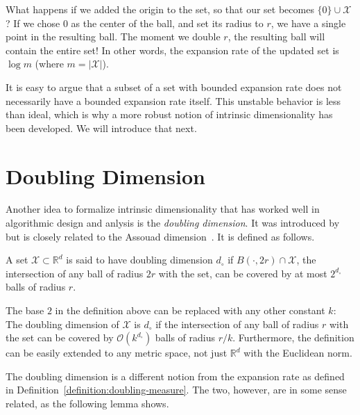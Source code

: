 What happens if we added the origin to the set, so that our set becomes $\{ 0 \} \cup \mathcal{X}$?
If we chose $0$ as the center of the ball, and set its radius to $r$,
we have a single point in the resulting ball. The moment we double $r$,
the resulting ball will contain the entire set! In other words, the expansion rate
of the updated set is $\log m$ (where $m = \lvert \mathcal{X} \rvert$).

It is easy to argue that a subset of a set with bounded expansion rate
does not necessarily have a bounded expansion rate itself.
This unstable behavior is less than ideal, which is why a more robust notion
of intrinsic dimensionality has been developed.
We will introduce that next.

\section{Doubling Dimension}
\label{section:intrinsic-dimensionality:doubling-dimension}

Another idea to formalize intrinsic dimensionality that has worked well
in algorithmic design and anlysis is the \emph{doubling dimension}. It was introduced
by~\cite{gupta2003doublingDimension} but is closely related to the
Assouad dimension~\citep{Assouad1983}. It is defined as follows.

\begin{definition}
    \label{definition:doubling-dimension}
    A set $\mathcal{X} \subset \mathbb{R}^d$ is said to have doubling dimension $d_\circ$ if
    $B(\cdot, 2r) \cap \mathcal{X}$, the intersection of any ball of radius $2r$ with the set,
    can be covered by at most $2^{d_\circ}$ balls of radius $r$.
\end{definition}

The base $2$ in the definition above can be replaced with any other
constant $k$: The doubling dimension of $\mathcal{X}$ is $d_\circ$ if
the intersection of any ball of radius $r$ with the set
can be covered by $\mathcal{O}(k^{d_\circ})$ balls of radius $r/k$.
Furthermore, the definition can be easily extended to any metric space,
not just $\mathbb{R}^d$ with the Euclidean norm.

The doubling dimension is a different notion from the expansion rate as defined in
Definition~\ref{definition:doubling-measure}. The two, however, are in some sense related,
as the following lemma shows.

